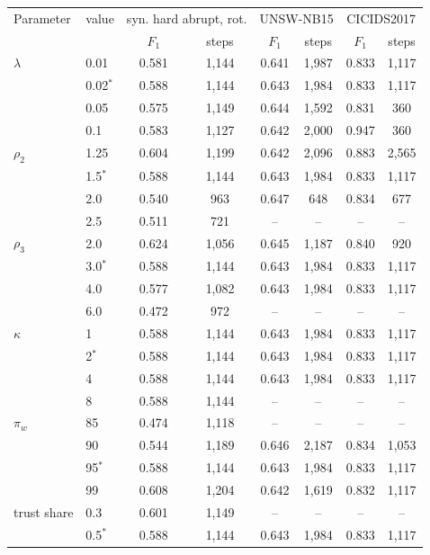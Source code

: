 \begin{tabular}{@{}llcccccc@{}}
\toprule
Parameter & value & \multicolumn{2}{c}{syn. hard abrupt, rot.} & \multicolumn{2}{c}{UNSW-NB15} & \multicolumn{2}{c}{CICIDS2017} \\
 & & $F_1$ & steps & $F_1$ & steps & $F_1$ & steps \\
\midrule
$\lambda$ & 0.01 & 0.581 & 1,144 & 0.641 & 1,987 & 0.833 & 1,117 \\
 & 0.02$^\ast$ & 0.588 & 1,144 & 0.643 & 1,984 & 0.833 & 1,117 \\
 & 0.05 & 0.575 & 1,149 & 0.644 & 1,592 & 0.831 & 360 \\
 & 0.1 & 0.583 & 1,127 & 0.642 & 2,000 & 0.947 & 360 \\
\addlinespace[2pt]
$\rho_2$ & 1.25 & 0.604 & 1,199 & 0.642 & 2,096 & 0.883 & 2,565 \\
 & 1.5$^\ast$ & 0.588 & 1,144 & 0.643 & 1,984 & 0.833 & 1,117 \\
 & 2.0 & 0.540 & 963 & 0.647 & 648 & 0.834 & 677 \\
 & 2.5 & 0.511 & 721 & -- & -- & -- & -- \\
\addlinespace[2pt]
$\rho_3$ & 2.0 & 0.624 & 1,056 & 0.645 & 1,187 & 0.840 & 920 \\
 & 3.0$^\ast$ & 0.588 & 1,144 & 0.643 & 1,984 & 0.833 & 1,117 \\
 & 4.0 & 0.577 & 1,082 & 0.643 & 1,984 & 0.833 & 1,117 \\
 & 6.0 & 0.472 & 972 & -- & -- & -- & -- \\
\addlinespace[2pt]
$\kappa$ & 1 & 0.588 & 1,144 & 0.643 & 1,984 & 0.833 & 1,117 \\
 & 2$^\ast$ & 0.588 & 1,144 & 0.643 & 1,984 & 0.833 & 1,117 \\
 & 4 & 0.588 & 1,144 & 0.643 & 1,984 & 0.833 & 1,117 \\
 & 8 & 0.588 & 1,144 & -- & -- & -- & -- \\
\addlinespace[2pt]
$\pi_w$ & 85 & 0.474 & 1,118 & -- & -- & -- & -- \\
 & 90 & 0.544 & 1,189 & 0.646 & 2,187 & 0.834 & 1,053 \\
 & 95$^\ast$ & 0.588 & 1,144 & 0.643 & 1,984 & 0.833 & 1,117 \\
 & 99 & 0.608 & 1,204 & 0.642 & 1,619 & 0.832 & 1,117 \\
\addlinespace[2pt]
trust share & 0.3 & 0.601 & 1,149 & -- & -- & -- & -- \\
 & 0.5$^\ast$ & 0.588 & 1,144 & 0.643 & 1,984 & 0.833 & 1,117 \\

\end{tabular}
